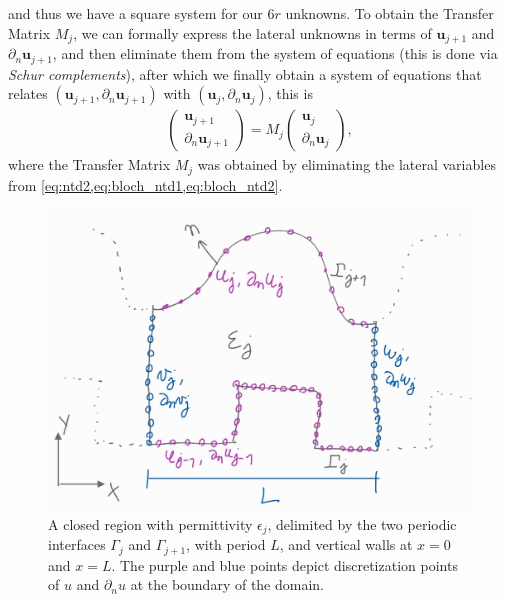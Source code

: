 \documentclass[reprint,amsmath,amssymb,
 aps]{revtex4-2}
\newcommand{\bol}{\boldsymbol}
\begin{document}
and thus we have a square system for our $6r$ unknowns. To obtain the Transfer Matrix $M_j$, we can formally express the lateral unknowns in terms of $\bol u_{j+1}$ and $\partial_n\bol u_{j+1}$, and then eliminate them from the system of equations (this is done via \textit{Schur complements}), after which we finally obtain a system of equations that relates $(\bol u_{j+1},\partial_n\bol u_{j+1})$ with $(\bol u_{j},\partial_n\bol u_{j})$, this is 
\begin{align}
\begin{pmatrix}
\bol u_{j+1} \\
\partial_n \bol u_{j+1} 
\end{pmatrix} 
= M_j
\begin{pmatrix}
\bol u_{j} \\
\partial_n \bol u_{j} 
\end{pmatrix},
\end{align}
where the Transfer Matrix $M_j$ was obtained by eliminating the lateral variables from \cref{eq:ntd2,eq:bloch_ntd1,eq:bloch_ntd2}.

\begin{figure}[h!]
\includegraphics[width=0.6\columnwidth]{figures/bie_domain.jpg}
\caption{A closed region with permittivity $\epsilon_j$, delimited by the two periodic interfaces $\Gamma_j$ and $\Gamma_{j+1}$, with period $L$, and vertical walls at $x=0$ and $x=L$. The purple and blue points depict discretization points of $u$ and $\partial_n u$ at the boundary of the domain.}
\label{fig:bie_domain}
\end{figure}
\end{document}
